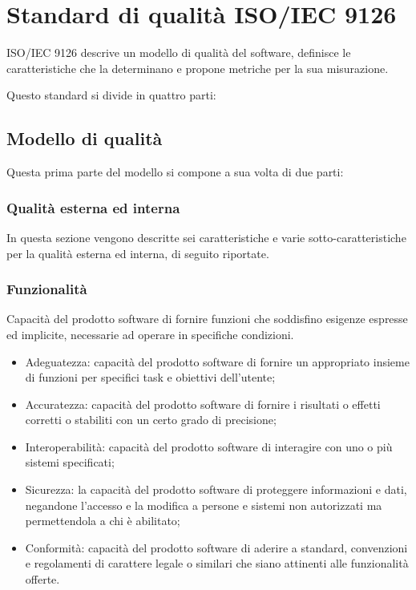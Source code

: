 \chapter{Standard di qualità ISO/IEC 9126}
ISO/IEC 9126 descrive un modello di qualità del software, definisce le caratteristiche che la determinano e propone metriche per la sua misurazione.

Questo standard si divide in quattro parti:

\section{Modello di qualità}
Questa prima parte del modello si compone a sua volta di due parti:

\subsection{Qualità esterna ed interna}
In questa sezione vengono descritte sei caratteristiche e varie sotto-caratteristiche per la qualità esterna ed interna, di seguito riportate.

\subsection{Funzionalità}
Capacità del prodotto software di fornire funzioni che soddisfino esigenze espresse ed implicite,
necessarie ad operare in specifiche condizioni.

\begin{itemize}
    \item  Adeguatezza: capacità del prodotto software di fornire un appropriato insieme di funzioni per specifici task e obiettivi dell'utente;
    \item Accuratezza: capacità del prodotto software di fornire i risultati o effetti corretti o stabiliti con un certo grado di precisione;
    \item Interoperabilità: capacità del prodotto software di interagire con uno o più sistemi specificati;
    \item Sicurezza: la capacità del prodotto software di proteggere informazioni e dati, negandone l'accesso e la modifica a persone e sistemi non autorizzati ma permettendola a chi è abilitato;
    \item Conformità: capacità del prodotto software di aderire a standard, convenzioni e regolamenti di carattere legale o similari che siano attinenti alle funzionalità offerte.
\end{itemize}

